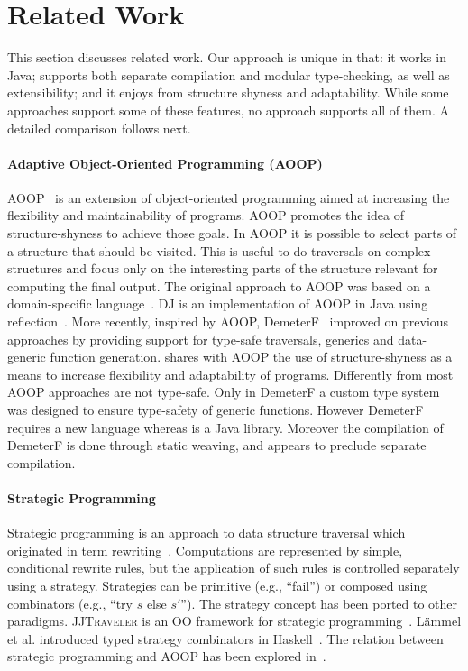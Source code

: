 \section{Related Work}\label{sec:related}


This section discusses related work. Our approach is unique in that: 
it works in Java; supports both separate compilation and modular 
type-checking, as well as extensibility; and it enjoys from structure 
shyness and adaptability. While some approaches support some of these 
features, no approach supports all of them. A detailed comparison
follows next.

\paragraph{Adaptive Object-Oriented Programming (AOOP)}
AOOP~\cite{DemeterBook} is an extension of object-oriented programming
aimed at increasing the flexibility and maintainability of
programs. AOOP promotes the idea of structure-shyness to achieve those
goals. In AOOP it is possible to select parts of a structure that
should be visited. This is useful to do traversals on complex
structures and focus only on the interesting parts of the structure
relevant for computing the final output. The original approach to AOOP
was based on a domain-specific language~\cite{DemeterBook}. DJ is an
implementation of AOOP in Java using reflection~\cite{DJ}. More
recently, inspired by AOOP, DemeterF~\cite{OOGP} improved on previous
approaches by providing support for type-safe traversals, generics and
data-generic function generation. \name shares with AOOP the use of
structure-shyness as a means to increase flexibility and adaptability
of programs.  Differently from \name most AOOP approaches are not
type-safe. Only in DemeterF a custom type system was designed to
ensure type-safety of generic functions. However DemeterF requires a
new language whereas \name is a Java library. Moreover the compilation
of DemeterF is done through static weaving, and appears to preclude
separate compilation.

\paragraph{Strategic Programming}

Strategic programming is an approach to data structure traversal which originated in term rewriting~\cite{borovansky1996elan,visser1998core,vandenBrand:2003:TRT:941566.941568}.
Computations are represented by simple, conditional rewrite rules, but the application of such rules is controlled separately using a strategy.
Strategies can be primitive (e.g., ``fail'') or composed using combinators (e.g., ``try $s$ else $s'$'').
The strategy concept has been ported to other paradigms. \textsc{JJTraveler} is an OO framework for strategic programming~\cite{visser01visitor}.
L\"ammel et al. introduced typed strategy combinators in Haskell~\cite{lammel2002typed}.
The relation between strategic programming and AOOP has been explored in~\cite{lammel2003strategic}.

